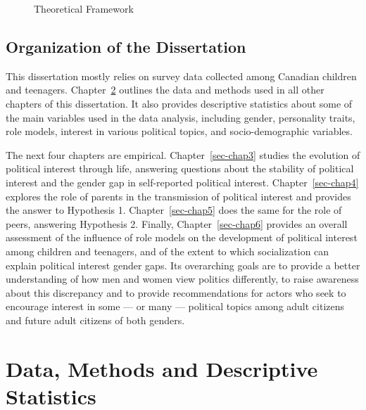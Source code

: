\documentclass[
  letterpaper,
  DIV=11,
  numbers=noendperiod]{scrreprt}
\begin{document}
\begin{figure}


\caption{\label{fig-hypotheses}Theoretical Framework}

\end{figure}%

\section{Organization of the
Dissertation}\label{organization-of-the-dissertation}

This dissertation mostly relies on survey data collected among Canadian
children and teenagers. Chapter~\ref{sec-chap2} outlines the data and
methods used in all other chapters of this dissertation. It also
provides descriptive statistics about some of the main variables used in
the data analysis, including gender, personality traits, role models,
interest in various political topics, and socio-demographic variables.

The next four chapters are empirical. Chapter~\ref{sec-chap3} studies
the evolution of political interest through life, answering questions
about the stability of political interest and the gender gap in
self-reported political interest. Chapter~\ref{sec-chap4} explores the
role of parents in the transmission of political interest and provides
the answer to Hypothesis 1. Chapter~\ref{sec-chap5} does the same for
the role of peers, answering Hypothesis 2. Finally,
Chapter~\ref{sec-chap6} provides an overall assessment of the influence
of role models on the development of political interest among children
and teenagers, and of the extent to which socialization can explain
political interest gender gaps. Its overarching goals are to provide a
better understanding of how men and women view politics differently, to
raise awareness about this discrepancy and to provide recommendations
for actors who seek to encourage interest in some --- or many ---
political topics among adult citizens and future adult citizens of both
genders.


\chapter{Data, Methods and Descriptive Statistics}\label{sec-chap2}
\end{document}
